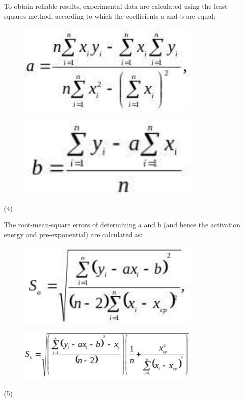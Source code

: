 To obtain reliable results, experimental data are calculated using the
least squares method, according to which the coefficients a and b are
equal:

\begin{figure}[H]
	\centering
	\includegraphics[width=0.8\textwidth]{assets/1060}
	\caption*{}
\end{figure}\begin{figure}[H]
	\centering
	\includegraphics[width=0.8\textwidth]{assets/1061}
	\caption*{}
\end{figure}
(4)

The root-mean-square errors of determining a and b (and hence the
activation energy and pre-exponential) are calculated as:

\begin{figure}[H]
	\centering
	\includegraphics[width=0.8\textwidth]{assets/1062}
	\caption*{}
\end{figure}\begin{figure}[H]
	\centering
	\includegraphics[width=0.8\textwidth]{assets/1063}
	\caption*{}
\end{figure}
(5)

